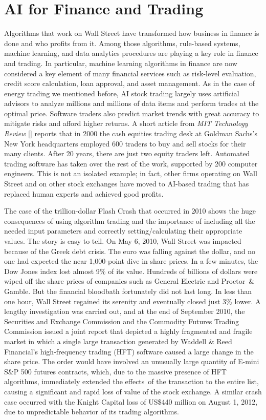 \section{\label{sec:6.7}AI for Finance and Trading}

Algorithms that work on Wall Street have transformed how business in finance is done and who profits from it. Among those algorithms, rule-based systems, machine learning, and data analytics procedures are playing a key role in finance and trading. In particular, machine learning algorithms in finance are now considered a key element of many financial services such as risk-level evaluation, credit score calculation, loan approval, and asset management. As in the case of energy trading we mentioned before, AI stock trading largely uses artificial advisors to analyze millions and millions of data items and perform trades at the optimal price. Software traders also predict market trends with great accuracy to mitigate risks and afford higher returns. A short article from \textit{MIT Technology Review} [\citealt{chap:6:Byrnes:2017}] reports that in 2000 the cash equities trading desk at Goldman Sachs's New York headquarters employed 600 traders to buy and sell stocks for their many clients. After 20 years, there are just two equity traders left. Automated trading software has taken over the rest of the work, supported by 200 computer engineers. This is not an isolated example; in fact, other firms operating on Wall Street and on other stock exchanges have moved to AI-based trading that has replaced human experts and achieved good profits.

The case of the trillion-dollar Flash Crash that occurred in 2010 shows the huge consequences of using algorithm trading and the importance\vadjust{\vfill\pagebreak} of including all the needed input parameters and correctly setting/{\allowbreak}calculating their appropriate values. The story is easy to tell. On May 6, 2010, Wall Street was impacted because of the Greek debt crisis. The euro was falling against the dollar, and no one had expected the near 1,000-point dive in share prices. In a few minutes, the Dow Jones index lost almost 9\% of its value. Hundreds of billions of dollars were wiped off the share prices of companies such as General Electric and Proctor~\& Gamble. But the financial bloodbath fortunately did not last long. In less than one hour, Wall Street regained its serenity and eventually closed just 3\% lower. A lengthy investigation was carried out, and at the end of September 2010, the Securities and Exchange Commission and the Commodity Futures Trading Commission issued a joint report that depicted a highly fragmented and fragile market in which a single large transaction generated by Waddell \& Reed Financial's high-frequency trading (HFT) software caused a large change in the share price. The order would have involved an unusually large quantity of E-mini S\&P 500 futures contracts, which, due to the massive presence of HFT algorithms, immediately extended the \hbox{effects of} the transaction to the entire list, causing a significant and rapid loss of value of the stock exchange. A similar crash case occurred with the Knight Capital loss of US\$440 million on August 1, 2012, due to unpredictable behavior of its trading algorithms.

